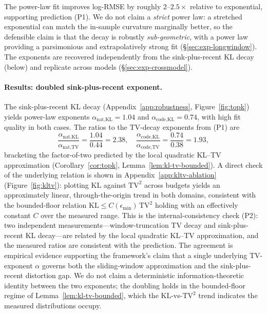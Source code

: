 \documentclass[11pt]{article}
\newcommand{\KLs}{\mathrm{KL}}
\newcommand{\TV}{\mathrm{TV}}
\theoremstyle{plain}
\theoremstyle{definition}
\theoremstyle{remark}
\begin{document}
The power-law fit improves log-RMSE by roughly $2$--$2.5\times$
relative to exponential, supporting prediction (P1). We do not claim a
\emph{strict} power law: a stretched exponential can match the
in-sample curvature marginally better, so the defensible claim is that
the decay is robustly \emph{sub-geometric}, with a power law providing
a parsimonious and extrapolatively strong fit
(\S\ref{sec:exp-longwindow}). The exponents
are recovered independently from the sink-plus-recent KL decay
(below) and replicate across models (\S\ref{sec:exp-crossmodel}).

\paragraph{Results: doubled sink-plus-recent exponent.}
The sink-plus-recent KL decay
(Appendix~\ref{app:robustness}, Figure~\ref{fig:topk})
yields power-law exponents $\alpha_{\text{nat,KL}} = 1.04$ and
$\alpha_{\text{code,KL}} = 0.74$, with high fit quality in both
cases. The ratios to the TV-decay exponents from (P1) are
\[
\frac{\alpha_{\text{nat,KL}}}{\alpha_{\text{nat,TV}}}
= \frac{1.04}{0.44} = 2.38,
\quad
\frac{\alpha_{\text{code,KL}}}{\alpha_{\text{code,TV}}}
= \frac{0.74}{0.38} = 1.93,
\]
bracketing the factor-of-two predicted by the local quadratic
KL--TV approximation (Corollary~\ref{cor:topk},
Lemma~\ref{lem:kl-tv-bounded}). A direct check of the underlying
relation is shown in Appendix~\ref{app:kltv-ablation}
(Figure~\ref{fig:kltv}): plotting $\KLs$ against
$\TV^2$ across budgets yields an approximately linear,
through-the-origin trend in both domains, consistent with the
bounded-floor relation $\KLs \le C(\epsilon_{\min})\,\TV^2$ holding
with an effectively constant $C$ over the measured range. This is the
internal-consistency check (P2): two independent
measurements---window-truncation TV decay and sink-plus-recent
KL decay---are related by the local quadratic KL--TV approximation,
and the measured ratios are consistent with the prediction. The
agreement is empirical evidence supporting the framework's claim
that a single underlying TV-exponent $\alpha$ governs both the
sliding-window approximation and the sink-plus-recent distortion
gap. We do not claim a deterministic information-theoretic
identity between the two exponents; the doubling holds in the
bounded-floor regime of Lemma~\ref{lem:kl-tv-bounded}, which the
$\KLs$-vs-$\TV^2$ trend indicates the measured distributions occupy.
\end{document}

